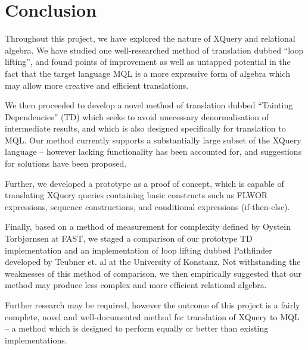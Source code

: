 \chapter{Conclusion}
\label{chapter:conclusion}
Throughout this project, we have explored the nature of XQuery and relational
algebra. We have studied one well-researched method of translation dubbed ``loop
lifting'', and found points of improvement as well as untapped potential in the
fact that the target language MQL is a more expressive form of algebra
which may allow more creative and efficient translations.

We then proceeded to develop a novel method of translation dubbed ``Tainting
Dependencies'' (TD) which seeks to avoid unecessary denormalisation of
intermediate results, and which is also designed specifically for translation
to MQL. Our method currently supports a substantially large subset of the XQuery
language -- however lacking functionality has been accounted for, and suggestions for
solutions have been proposed.

Further, we developed a prototype as a proof of concept, which is capable of
translating XQuery queries containing basic constructs such as FLWOR
expressions, sequence constructions, and conditional expressions (if-then-else).

Finally, based on a method of measurement for complexity defined by Oystein
Torbj\o rnsen at FAST, we staged a comparison of our prototype TD implementation
and an implementation of loop lifting dubbed Pathfinder developed by Teubner
et. al at the University of Konstanz. Not withstanding the weaknesses of this
method of comparison, we then empirically suggested that our method may
produce less complex and more efficient relational algebra.

Further research may be required, however the outcome of this project is a
fairly complete, novel and well-documented method for translation of XQuery to
MQL -- a method which is designed to perform equally or better than existing
implementations.

% 
